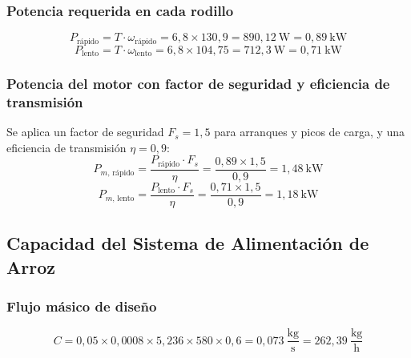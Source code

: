 \subsubsection{Potencia requerida en cada rodillo}
\begin{equation}
P_{\text{rápido}} = T \cdot \omega_{\text{rápido}} = 6{,}8 \times 130{,}9 = 890{,}12\ \text{W} = 0{,}89\ \text{kW}
\label{eq:Prap}
\end{equation}
\begin{equation}
P_{\text{lento}} = T \cdot \omega_{\text{lento}} = 6{,}8 \times 104{,}75 = 712{,}3\ \text{W} = 0{,}71\ \text{kW}
\label{eq:Plento}
\end{equation}

\subsubsection{Potencia del motor con factor de seguridad y eficiencia de transmisión}
Se aplica un factor de seguridad $F_{s} = 1{,}5$ para arranques y picos de carga, y una eficiencia de transmisión $\eta = 0{,}9$:
\begin{equation}
P_{m,\,\text{rápido}} = \frac{P_{\text{rápido}} \cdot F_{s}}{\eta} = \frac{0{,}89 \times 1{,}5}{0{,}9} = 1{,}48\ \text{kW}
\label{eq:Pm_rap}
\end{equation}
\begin{equation}
P_{m,\,\text{lento}} = \frac{P_{\text{lento}} \cdot F_{s}}{\eta} = \frac{0{,}71 \times 1{,}5}{0{,}9} = 1{,}18\ \text{kW}
\label{eq:Pm_lento}
\end{equation}

\subsection{Capacidad del Sistema de Alimentación de Arroz}

\subsubsection{Flujo másico de diseño}
\begin{equation}
C = 0{,}05 \times 0{,}0008 \times 5{,}236 \times 580 \times 0{,}6 = 0{,}073\ \frac{\text{kg}}{\text{s}} = 262{,}39\ \frac{\text{kg}}{\text{h}}
\end{equation}

